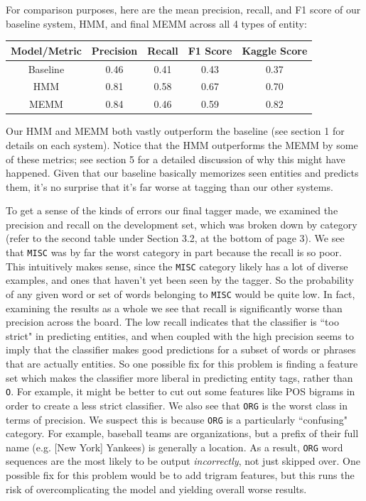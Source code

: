 \documentclass[12pt]{article}
\begin{document}
For comparison purposes, here are the mean precision, recall, and F1 score of our baseline system, HMM, and final MEMM across all 4 types of entity:
\begin{center}
	\begin{tabular}{|c|c|c|c|c|}
		\hline
		\textbf{Model/Metric} & Precision & Recall & F1 Score & Kaggle Score\\
		\hline
		Baseline & 0.46 & 0.41 & 0.43 & 0.37\\
		\hline
		HMM & 0.81 & 0.58 & 0.67 & 0.70\\
		\hline
		MEMM & 0.84 & 0.46 & 0.59 & 0.82\\
		\hline
	\end{tabular}
\end{center}
Our HMM and MEMM both vastly outperform the baseline (see section 1 for details on each system). Notice that the HMM outperforms the MEMM by some of these metrics; see section 5 for a detailed discussion of why this might have happened. Given that our baseline basically memorizes seen entities and predicts them, it's no surprise that it's far worse at tagging than our other systems. 

To get a sense of the kinds of errors our final tagger made, we examined the precision and recall on the development set, which was broken down by category (refer to the second table under Section 3.2, at the bottom of page 3). We see that {\tt MISC} was by far the worst category in part because the recall is so poor. This intuitively makes sense, since the {\tt MISC} category likely has a lot of diverse examples, and ones that haven't yet been seen by the tagger. So the probability of any given word or set of words belonging to {\tt MISC} would be quite low. In fact, examining the results as a whole we see that recall is significantly worse than precision across the board. The low recall indicates that the classifier is ``too strict" in predicting entities, and when coupled with the high precision seems to imply that the classifier makes good predictions for a subset of words or phrases that are actually entities. So one possible fix for this problem is finding a feature set which makes the classifier more liberal in predicting entity tags, rather than {\tt O}. For example, it might be better to cut out some features like POS bigrams in order to create a less strict classifier. We also see that {\tt ORG} is the worst class in terms of precision. We suspect this is because {\tt ORG} is a particularly ``confusing" category. For example, baseball teams are organizations, but a prefix of their full name (e.g. [New York] Yankees) is generally a location. As a result, {\tt ORG} word sequences are the most likely to be output \emph{incorrectly}, not just skipped over. One possible fix for this problem would be to add trigram features, but this runs the risk of overcomplicating the model and yielding overall worse results. 
\end{document}
